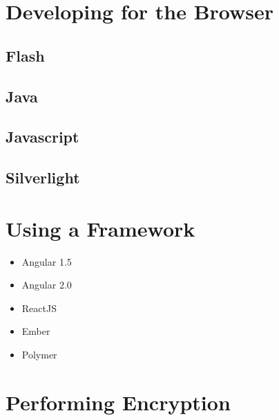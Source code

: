 	\section{Developing for the Browser}
		\subsection{Flash}
		\subsection{Java}
		\subsection{Javascript}
		\subsection{Silverlight}


	\section{Using a Framework}
		\begin{itemize}
			\item Angular 1.5
			\item Angular 2.0
			\item ReactJS
			\item Ember
			\item Polymer
		\end{itemize}

	\section{Performing Encryption}